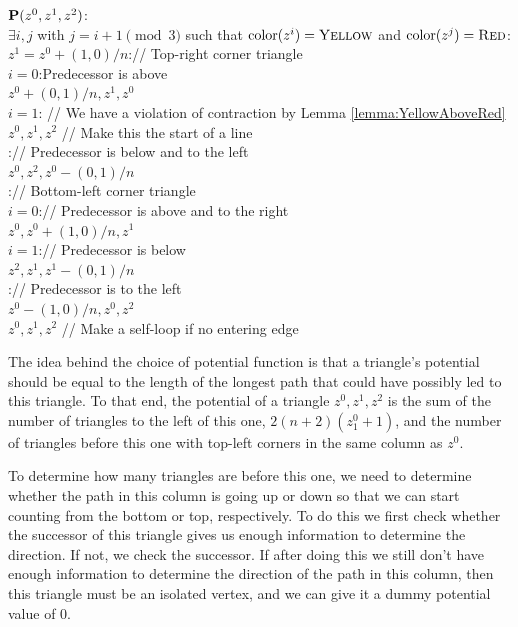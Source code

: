   \begin{algo}
    $\mathbf{P}(z^0,z^1,z^2)$:\+
    \\ \IfB $\exists i,j$ with $j = i + 1 \pmod{3}$ such that $\operatorname{color}(z^i) = \textsc{Yellow}$ and $\operatorname{color}(z^j) = \textsc{Red}$:\+
    \\   \IfB $z^1 = z^0 + (1,0)/n$:\quad // Top-right corner triangle\+    
    \\     \IfB $i = 0$:\quad Predecessor is above\+
    \\       \ReturnB $z^0+(0,1)/n,z^1,z^0$\-
    \\     \ElseIfB $i = 1$: \quad// We have a violation of contraction by Lemma \ref{lemma:YellowAboveRed}\+
    \\       \ReturnB $z^0,z^1,z^2$ \quad// Make this the start of a line\-
    \\     \ElseB:\quad // Predecessor is below and to the left\+
    \\       \ReturnB $z^0,z^2,z^0 - (0,1)/n$\-\-
    \\   \ElseB:\quad // Bottom-left corner triangle\+
    \\     \IfB $i = 0$:\quad // Predecessor is above and to the right\+
    \\       \ReturnB $z^0,z^0+(1,0)/n,z^1$\-
    \\     \ElseIfB $i = 1$:\quad // Predecessor is below\+ 
    \\       \ReturnB $z^2,z^1,z^1-(0,1)/n$\-
    \\     \ElseB:\quad // Predecessor is to the left\+
    \\       \ReturnB $z^0-(1,0)/n,z^0,z^2$\-\-\-
    \\ \ReturnB $z^0,z^1,z^2$ \quad// Make a self-loop if no entering edge
  \end{algo}

  The idea behind the choice of potential function is that a triangle's potential should be equal to the length of the longest path that could have possibly led to this triangle. To that end, the potential of a triangle $z^0,z^1,z^2$ is the sum of the number of triangles to the left of this one, $2(n+2)(z^0_1 + 1)$, and the number of triangles before this one with top-left corners in the same column as $z^0$.

  To determine how many triangles are before this one, we need to determine whether the path in this column is going up or down so that we can start counting from the bottom or top, respectively. To do this we first check whether the successor of this triangle gives us enough information to determine the direction. If not, we check the successor. If after doing this we still don't have enough information to determine the direction of the path in this column, then this triangle must be an isolated vertex, and we can give it a dummy potential value of $0$.


